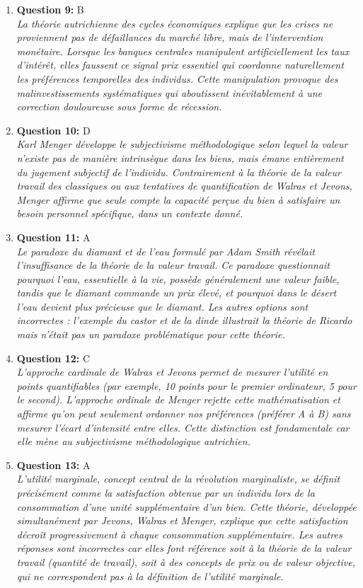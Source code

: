 \documentclass[12pt,a4paper]{article}
\begin{document}
\begin{enumerate}
\item \textbf{Question 9:} B
\\ \textit{La théorie autrichienne des cycles économiques explique que les crises ne proviennent pas de défaillances du marché libre, mais de l'intervention monétaire. Lorsque les banques centrales manipulent artificiellement les taux d'intérêt, elles faussent ce signal prix essentiel qui coordonne naturellement les préférences temporelles des individus. Cette manipulation provoque des malinvestissements systématiques qui aboutissent inévitablement à une correction douloureuse sous forme de récession.}

\item \textbf{Question 10:} D
\\ \textit{Karl Menger développe le subjectivisme méthodologique selon lequel la valeur n'existe pas de manière intrinsèque dans les biens, mais émane entièrement du jugement subjectif de l'individu. Contrairement à la théorie de la valeur travail des classiques ou aux tentatives de quantification de Walras et Jevons, Menger affirme que seule compte la capacité perçue du bien à satisfaire un besoin personnel spécifique, dans un contexte donné.}

\item \textbf{Question 11:} A
\\ \textit{Le paradoxe du diamant et de l'eau formulé par Adam Smith révélait l'insuffisance de la théorie de la valeur travail. Ce paradoxe questionnait pourquoi l'eau, essentielle à la vie, possède généralement une valeur faible, tandis que le diamant commande un prix élevé, et pourquoi dans le désert l'eau devient plus précieuse que le diamant. Les autres options sont incorrectes : l'exemple du castor et de la dinde illustrait la théorie de Ricardo mais n'était pas un paradoxe problématique pour cette théorie.}

\item \textbf{Question 12:} C
\\ \textit{L'approche cardinale de Walras et Jevons permet de mesurer l'utilité en points quantifiables (par exemple, 10 points pour le premier ordinateur, 5 pour le second). L'approche ordinale de Menger rejette cette mathématisation et affirme qu'on peut seulement ordonner nos préférences (préférer A à B) sans mesurer l'écart d'intensité entre elles. Cette distinction est fondamentale car elle mène au subjectivisme méthodologique autrichien.}

\item \textbf{Question 13:} A
\\ \textit{L'utilité marginale, concept central de la révolution marginaliste, se définit précisément comme la satisfaction obtenue par un individu lors de la consommation d'une unité supplémentaire d'un bien. Cette théorie, développée simultanément par Jevons, Walras et Menger, explique que cette satisfaction décroît progressivement à chaque consommation supplémentaire. Les autres réponses sont incorrectes car elles font référence soit à la théorie de la valeur travail (quantité de travail), soit à des concepts de prix ou de valeur objective, qui ne correspondent pas à la définition de l'utilité marginale.}


\end{enumerate}
\end{document}
